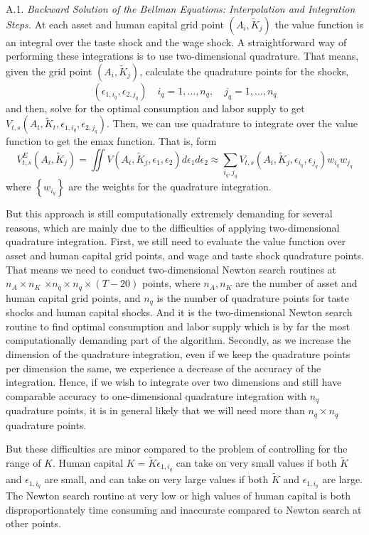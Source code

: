 \documentclass{article}
\begin{document}
\label{section:A1}
\quad A.1.      \textit{Backward Solution of the Bellman Equations: Interpolation and Integration Steps.}      At each asset and human capital grid point $\left(A_i, \tilde{K}_j\right)$ the value function is an integral over the taste shock and the wage shock. A straightforward way of performing these integrations is to use two-dimensional quadrature. That means, given the grid point $\left(A_i, \tilde{K}_j\right)$, calculate the quadrature points for the shocks,
$$
\left(\epsilon_{1, i_q}, \epsilon_{2, j_q}\right) \quad i_q=1, \ldots, n_q, \quad j_q=1, \ldots, n_q
$$
and then, solve for the optimal consumption and labor supply to get $V_{t, s}\left(A_t, \tilde{K}_t, \epsilon_{1, i_q}, \epsilon_{2, j_q}\right)$. Then, we can use quadrature to integrate over the value function to get the emax function. That is, form
$$
V_{t, s}^E\left(A_i, \tilde{K}_j\right)=\iint V\left(A_i, \tilde{K}_j, \epsilon_1, \epsilon_2\right) d \epsilon_1 d \epsilon_2 \approx \sum_{i_q, j_q} V_{t, s}\left(A_i, \tilde{K}_j, \epsilon_{i_q}, \epsilon_{j_q}\right) w_{i_q} w_{j_q}
$$
where $\left\{w_{i_q}\right\}$ are the weights for the quadrature integration. \par
But this approach is still computationally extremely demanding for several reasons, which are mainly due to the difficulties of applying two-dimensional quadrature integration. First, we still need to evaluate the value function over asset and human capital grid points, and wage and taste shock quadrature points. That means we need to conduct two-dimensional Newton search routines at $n_A \times n_K$ $\times n_q \times n_q \times(T-20)$ points, where $n_A, n_K$ are the number of asset and human capital grid points, and $n_q$ is the number of quadrature points for taste shocks and human capital shocks. And it is the two-dimensional Newton search routine to find optimal consumption and labor supply which is by far the most computationally demanding part of the algorithm. Secondly, as we increase the dimension of the quadrature integration, even if we keep the quadrature points per dimension the same, we experience a decrease of the accuracy of the integration. Hence, if we wish to integrate over two dimensions and still have comparable accuracy to one-dimensional quadrature integration with $n_q$ quadrature points, it is in general likely that we will need more than $n_q \times n_q$ quadrature points.\par
But these difficulties are minor compared to the problem of controlling for the range of $K$. Human capital $K=\tilde{K} \epsilon_{1, i_q}$ can take on very small values if both $\tilde{K}$ and $\epsilon_{1, i_q}$ are small, and can take on very large values if both $\tilde{K}$ and $\epsilon_{1, i_q}$ are large. The Newton search routine at very low or high values of human capital is both disproportionately time consuming and inaccurate compared to Newton search at other points.\par
\end{document}
